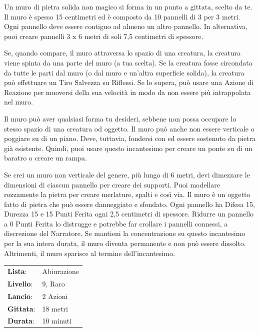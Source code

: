\begin{multicols}{2}
Un muro di pietra solida non magico si forma in un punto a gittata, scelto da te. Il muro è spesso 15 centimetri ed è composto da 10 pannelli di 3 per 3 metri. Ogni pannello deve essere contiguo ad almeno un altro pannello. In alternativa, puoi creare pannelli 3 x 6 metri di soli 7,5 centimetri di spessore.

Se, quando compare, il muro attraversa lo spazio di una creatura, la creatura viene spinta da una parte del muro (a tua scelta). Se la creatura fosse circondata da tutte le parti dal muro (o dal muro e un'altra superficie solida), la creatura può effettuare un Tiro Salvezza su Riflessi. Se lo supera, può usare una Azione di Reazione per muoversi della sua velocità in modo da non essere più intrappolata nel muro.

Il muro può aver qualsiasi forma tu desideri, sebbene non possa occupare lo stesso spazio di una creatura od oggetto. Il muro può anche non essere verticale o poggiare su di un piano. Deve, tuttavia, fondersi con ed essere sostenuto da pietra già esistente. Quindi, puoi usare questo incantesimo per creare un ponte su di un baratro o creare un rampa.

Se crei un muro non verticale del genere, più lungo di 6 metri, devi dimezzare le dimensioni di ciascun pannello per creare dei supporti. Puoi modellare rozzamente la pietra per creare merlature, spalti e così via. Il muro è un oggetto fatto di pietra che può essere danneggiato e sfondato. Ogni pannello ha Difesa 15, Durezza 15 e 15 Punti Ferita ogni 2,5 centimetri di spessore. Ridurre un pannello a 0 Punti Ferita lo distrugge e potrebbe far crollare i pannelli connessi, a discrezione del Narratore. Se mantieni la concentrazione su questo incantesimo per la sua intera durata, il muro diventa permanente e non può essere dissolto. Altrimenti, il muro sparisce al termine dell'incantesimo.

\noindent\begin{tabularx}{\linewidth}{p{1.3cm}X}
	\rowcolor{gray!20}\textbf{Lista}: & Abiurazione \\
	\textbf{Livello}: & 9, Raro \\
	\rowcolor{gray!20}\textbf{Lancio}: & 2 Azioni \\
	\textbf{Gittata}: & 18 metri \\
	\rowcolor{gray!20}\textbf{Durata}: & 10 minuti \\
\end{tabularx}\smallskip


\end{multicols}
